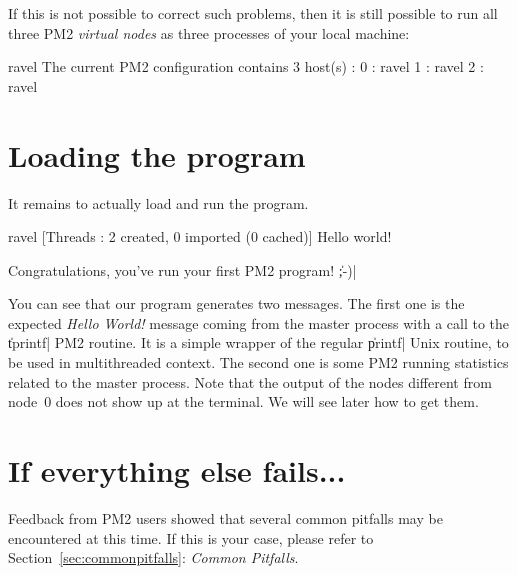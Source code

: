 If this is not possible to correct such problems, then it is still
possible to run all three PM2 \emph{virtual nodes} as three processes
of your local machine:
\begin{shell}
ravel%
The current PM2 configuration contains 3 host(s) :
0 : ravel
1 : ravel
2 : ravel
\end{shell}

\section{Loading the program}

It remains to actually load and run the program.
\begin{shell}
ravel%
[Threads : 2 created, 0 imported (0 cached)]
Hello world!
\end{shell}
Congratulations, you've run your first PM2 program! \|;-)|

You can see that our program generates two messages. The first one is
the expected \emph{Hello World!} message coming from the master
process with a call to the \|tprintf| PM2 routine. It is a simple
wrapper of the regular \|printf| Unix routine, to be used in
multithreaded context. The second one is some PM2 running statistics
related to the master process. Note that the output of the nodes
different from node~0 does not show up at the terminal. We will see
later how to get them.

\section{If everything else fails...}

Feedback from PM2 users showed that several common pitfalls may be
encountered at this time. If this is your case, please refer to
Section~\ref{sec:commonpitfalls}: \emph{Common Pitfalls}. 
